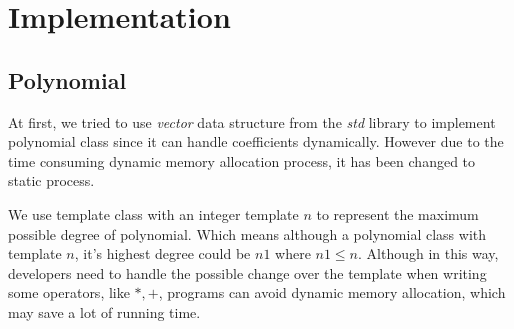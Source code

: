 \section{Implementation} \label{implementation}

\subsection{Polynomial} 

At first, we tried to use \textit{vector} data structure from the \textit{std}
library to implement polynomial class since it can handle coefficients
dynamically. However due to the time consuming dynamic memory allocation process,
it has been changed to static process.  

We use template class with an integer template $n$ to represent the maximum
possible degree of polynomial. Which means although a polynomial class with
template $n$, it's highest degree could be $n1$ where $n1 \leq n$. Although in
this way, developers need to handle the possible change over the template when
writing some operators, like $*,+$, programs can avoid dynamic memory
allocation, which may save a lot of running time.







